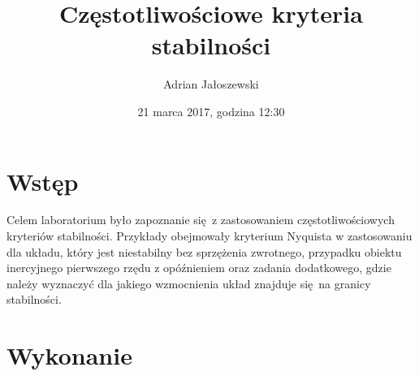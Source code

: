 \documentclass[a4paper, 12pt]{article}
\title{Częstotliwościowe kryteria stabilności}
\author{Adrian Jałoszewski}
\date{21 marca 2017, godzina 12:30}
\begin{document}
	\lstset{language=Python, basicstyle=\footnotesize,
		keepspaces=true,frame=single,tabsize=4}
	\maketitle
	\section{Wstęp}
		Celem laboratorium było zapoznanie się z zastosowaniem częstotliwościowych kryteriów stabilności. Przykłady obejmowały kryterium Nyquista w zastosowaniu dla układu, który jest niestabilny bez sprzężenia zwrotnego, przypadku obiektu inercyjnego pierwszego rzędu z opóźnieniem oraz zadania dodatkowego, gdzie należy wyznaczyć dla jakiego wzmocnienia układ znajduje się na granicy stabilności.
	\section{Wykonanie}
\end{document}
